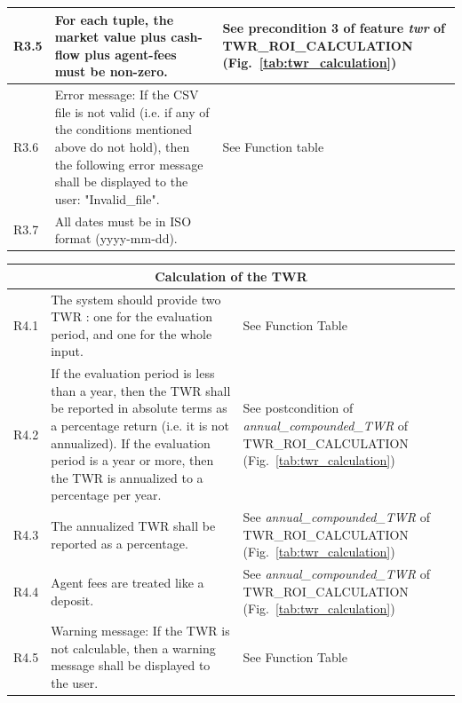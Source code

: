 \documentclass[runningheads,12pt]{article}
\begin{document}
{\begin{longtable}{|l|p{9cm}|p{5cm}|}
\hline
R3.5 &  For each tuple, the market value plus cash-flow plus agent-fees must be non-zero. & See precondition 3 of feature \textit{twr} of TWR\_ROI\_CALCULATION (Fig.~\ref{tab:twr_calculation})\\

\hline
R3.6 &  Error message: If the CSV file is not valid (i.e. if any of the conditions mentioned above do not hold), then the following error message shall be displayed to the user: "Invalid\_file". & See Function table\\

\hline
R3.7 &  All dates must be in ISO format (yyyy-mm-dd). & \\

\hline
\end{longtable}
\centering
\begin{longtable}{|l|p{9cm}|p{5cm}|}

\hline
\multicolumn{3}{|c|}{\textbf{Calculation of the TWR}} \\

\hline
R4.1 & The system should provide two TWR : one for the evaluation period, and one for the whole input. & See Function Table \\

\hline
R4.2 & If the evaluation period is less than a year, then the TWR shall be reported in absolute terms as a percentage return (i.e. it is not annualized). If the evaluation period is a year or more, then the TWR is annualized to a percentage per year. & See postcondition of  \textit{annual\_compounded\_TWR} of TWR\_ROI\_CALCULATION (Fig.~\ref{tab:twr_calculation})\\

\hline
R4.3 & The annualized TWR shall be reported as a percentage. & See \textit{annual\_compounded\_TWR} of TWR\_ROI\_CALCULATION (Fig.~\ref{tab:twr_calculation})\\

\hline
R4.4 & Agent fees are treated like a deposit. & See \textit{annual\_compounded\_TWR} of TWR\_ROI\_CALCULATION (Fig.~\ref{tab:twr_calculation})\\

\hline
R4.5 & Warning message: If the TWR is not calculable, then a warning message shall be displayed to the user. & See Function Table\\

\hline
\end{longtable}
\centering
\begin{longtable}{|l|p{9cm}|p{5cm}|}


\end{longtable}}
\end{document}
